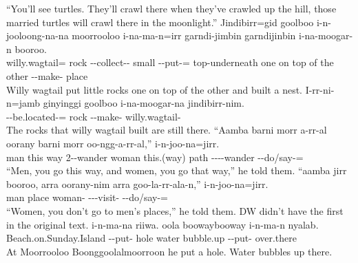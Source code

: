 \begin{exye}
\ft ``You'll see turtles. They'll crawl there when they've crawled up the hill, those married turtles will crawl there in the moonlight.''
\exy {}
\gll Jindibirr=gid goolboo i-n-jooloong-na-na moorrooloo i-na-ma-n=irr garndi-jimbin garndijinbin i-na-moogar-n booroo.\\
willy.wagtail= rock --collect-- small --put-= top-underneath one on top of the other --make- place\\
\ft Willy wagtail put little rocks one on top of the other and built a nest.
\exy {}
\gll I-rr-ni-n=jamb ginyinggi goolboo i-na-moogar-na jindibirr-nim.\\
--be.located-=  rock --make- willy.wagtail-\\
\ft The rocks that willy wagtail built are still there.
\exy {}
\gll ``Aamba barni morr a-rr-al oorany barni morr oo-ngg-a-rr-al,'' i-n-joo-na=jirr.\\
man this way 2--wander woman this.(way) path ----wander --do/say-=\\
\ft ``Men, you go this way, and women, you go that way,'' he told them.
\exy {}
\gll ``aamba jirr booroo, arra oorany-nim arra goo-la-rr-ala-n,'' i-n-joo-na=jirr.\\
man  place  woman-  ---visit- --do/say-=\\
\ft ``Women, you don't go to men's places,'' he told them.
\nt DW didn't have the first  in the original text.
\exy {}
 i-n-ma-na riiwa. oola boowaybooway i-n-ma-n nyalab.\\
Beach.on.Sunday.Island --put- hole water bubble.up --put- over.there\\
\ft At Moorrooloo Boonggoolalmoorroon he put a hole. Water bubbles up there.

\end{exye}
